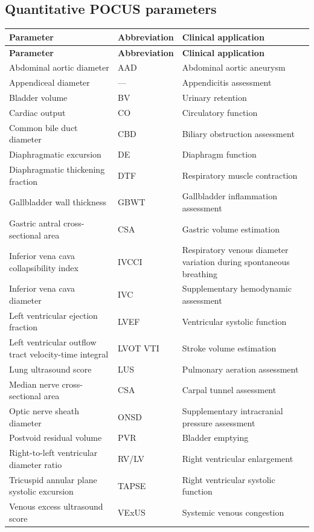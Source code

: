 \subsection{Quantitative POCUS parameters}
\begin{longtable}{@{}p{}p{}p{}@{}}
\toprule
\textbf{Parameter} & \textbf{Abbreviation} & \textbf{Clinical application} \\
\midrule
\endfirsthead
\toprule
\textbf{Parameter} & \textbf{Abbreviation} & \textbf{Clinical application} \\
\midrule
\endhead
Abdominal aortic diameter & AAD & Abdominal aortic aneurysm \\
Appendiceal diameter & --- & Appendicitis assessment \\
Bladder volume & BV & Urinary retention \\
Cardiac output & CO & Circulatory function \\
Common bile duct diameter & CBD & Biliary obstruction assessment \\
Diaphragmatic excursion & DE & Diaphragm function \\
Diaphragmatic thickening fraction & DTF & Respiratory muscle contraction \\
Gallbladder wall thickness & GBWT & Gallbladder inflammation assessment \\
Gastric antral cross-sectional area & CSA & Gastric volume estimation \\
Inferior vena cava collapsibility index & IVCCI & Respiratory venous diameter variation during spontaneous breathing \\
Inferior vena cava diameter & IVC & Supplementary hemodynamic assessment \\
Left ventricular ejection fraction & LVEF & Ventricular systolic function \\
Left ventricular outflow tract velocity-time integral & LVOT VTI & Stroke volume estimation \\
Lung ultrasound score & LUS & Pulmonary aeration assessment \\
Median nerve cross-sectional area & CSA & Carpal tunnel assessment \\
Optic nerve sheath diameter & ONSD & Supplementary intracranial pressure assessment \\
Postvoid residual volume & PVR & Bladder emptying \\
Right-to-left ventricular diameter ratio & RV/LV & Right ventricular enlargement \\
Tricuspid annular plane systolic excursion & TAPSE & Right ventricular systolic function \\
Venous excess ultrasound score & VExUS & Systemic venous congestion \\
\bottomrule
\end{longtable}

